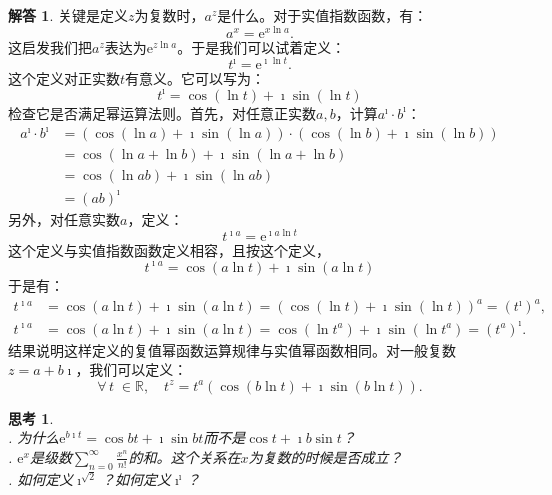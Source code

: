 \documentclass[12pt,UTF8]{ctexbook}
\newcommand{\e}{\mathrm{e}}
\theoremstyle{definition}
\newtheorem*{so}{解答}
\theoremstyle{plain}
\newtheorem{sk}{思考}[section]
\begin{document}
\begin{so}
    关键是定义$z$为复数时，$a^{z}$是什么。对于实值指数函数，有：
    $$ a^{x} = \e^{x\ln{a}}. $$
    这启发我们把$a^{z}$表达为$\e^{z\ln{a}}$。于是我们可以试着定义：
    $$ t^{\imath} = \e^{\imath \ln{t}}. $$
    这个定义对正实数$t$有意义。它可以写为：
    $$ t^{\imath} = \cos{(\ln{t})} + \imath \sin{(\ln{t})} $$
    检查它是否满足幂运算法则。首先，对任意正实数$a,b$，计算$a^{\imath} \cdot b^{\imath}$：
    \begin{align*}
        a^{\imath} \cdot b^{\imath} &= (\cos{(\ln{a})} + \imath \sin{(\ln{a})}) \cdot (\cos{(\ln{b})} + \imath \sin{(\ln{b})}) \\
        &= \cos{(\ln{a} + \ln{b})} + \imath \sin{(\ln{a} + \ln{b})} \\
        &= \cos{(\ln{ab})} + \imath \sin{(\ln{ab})} \\
        &= (ab)^{\imath}
    \end{align*}
    另外，对任意实数$a$，定义：
    $$ t^{\imath a} = \e^{\imath a\ln{t}} $$
    这个定义与实值指数函数定义相容，且按这个定义，
    $$  t^{\imath a} = \cos{(a\ln{t})} + \imath \sin{(a\ln{t})} $$
    于是有：
    \begin{align*}
        t^{\imath a} &= \cos{(a\ln{t})} + \imath \sin{(a\ln{t})} = (\cos{(\ln{t})} + \imath \sin{(\ln{t})})^a = \left(t^\imath\right)^{a}, \\
        t^{\imath a} &= \cos{(a\ln{t})} + \imath \sin{(a\ln{t})} = \cos{(\ln{t^a})} + \imath \sin{(\ln{t^a})} = \left(t^a\right)^{\imath}.
    \end{align*}
    结果说明这样定义的复值幂函数运算规律与实值幂函数相同。对一般复数$z = a + b\imath$，我们可以定义：
    $$ \forall \, t\; \in \mathbb{R}, \quad t^{z} = t^a (\cos{(b\ln{t})} + \imath \sin{(b\ln{t})}). $$
\end{so}

\begin{sk}
    \mbox{} \\
    . 为什么$\e^{b\imath t} = \cos{bt} + \imath \sin{bt}$而不是$\cos{t} + \imath b\sin{t}$？\\
    . $\e^x$是级数$\sum_{n=0}^{\infty} \frac{x^n}{n!}$的和。这个关系在$x$为复数的时候是否成立？\\
    . 如何定义$\imath^{\sqrt{2}}$？如何定义$\imath^{\imath}$？
\end{sk}
\end{document}
